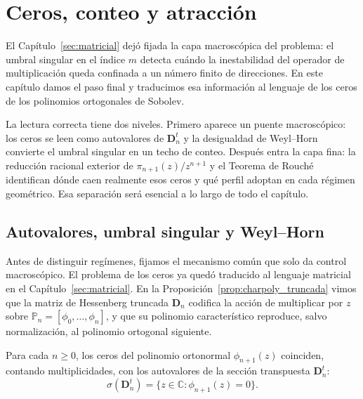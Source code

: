 \chapter{Ceros, conteo y atracción}\label{sec:ceros_acotacion}

El Capítulo~\ref{sec:matricial} dejó fijada la capa macroscópica del problema: el umbral singular en el índice $m$ detecta cuándo la inestabilidad del operador de multiplicación queda confinada a un número finito de direcciones. En este capítulo damos el paso final y traducimos esa información al lenguaje de los ceros de los polinomios ortogonales de Sobolev.

La lectura correcta tiene dos niveles. Primero aparece un puente macroscópico: los ceros se leen como autovalores de $\mathbf D_n^t$ y la desigualdad de Weyl--Horn convierte el umbral singular en un techo de conteo. Después entra la capa fina: la reducción racional exterior de $\pi_{n+1}(z)/z^{n+1}$ y el Teorema de Rouché identifican dónde caen realmente esos ceros y qué perfil adoptan en cada régimen geométrico. Esa separación será esencial a lo largo de todo el capítulo.

\section{Autovalores, umbral singular y Weyl--Horn}\label{sec:weyl_horn}

Antes de distinguir regímenes, fijamos el mecanismo común que solo da control macroscópico. El problema de los ceros ya quedó traducido al lenguaje matricial en el Capítulo~\ref{sec:matricial}. En la Proposición~\ref{prop:charpoly_truncada} vimos que la matriz de Hessenberg truncada $\mathbf D_n$ codifica la acción de multiplicar por $z$ sobre $\mathbb P_n=[\phi_0,\dots,\phi_n]$, y que su polinomio característico reproduce, salvo normalización, al polinomio ortogonal siguiente.

\begin{prop}\label{prop:autovalores_ceros}
	Para cada $n \ge 0$, los ceros del polinomio ortonormal $\phi_{n+1}(z)$ coinciden, contando multiplicidades, con los autovalores de la sección transpuesta $\mathbf{D}_n^t$:
	\[
		\sigma(\mathbf{D}_n^t) = \{z \in \mathbb{C} : \phi_{n+1}(z) = 0\}.
	\]
\end{prop}

